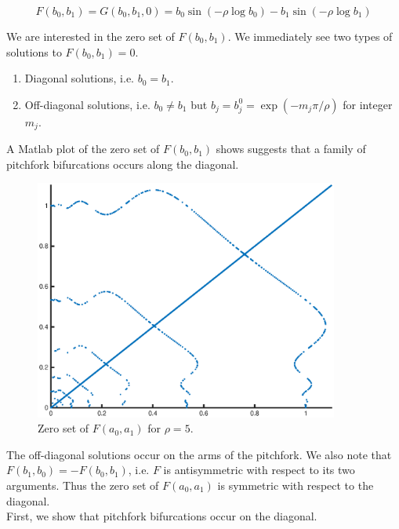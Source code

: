 \documentclass[thesis.tex]{subfiles}
\begin{document}
\begin{equation}\label{defF}
F(b_0, b_1) = G(b_0, b_1, 0) = 
b_0 \sin \left( -\rho \log b_0 \right) - b_1 \sin \left( -\rho \log b_1 \right)
\end{equation}

We are interested in the zero set of $F(b_0, b_1)$. We immediately see two types of solutions to $F(b_0,b_1) = 0$. 

\begin{enumerate}
	\item Diagonal solutions, i.e. $b_0 = b_1$.
	\item Off-diagonal solutions, i.e. $b_0 \neq b_1$ but $b_j = b_j^0 = \exp(-m_j \pi / \rho )$ for integer $m_j$.
\end{enumerate}

A Matlab plot of the zero set of $F(b_0, b_1)$ shows suggests that a family of pitchfork bifurcations occurs along the diagonal. 

\begin{figure}[H]
\label{fig:Fzeronumeric}
\includegraphics[width=10cm]{periodic/zeroset5}
\caption{Zero set of $F(a_0, a_1)$ for $\rho = 5$.}
\end{figure} 

The off-diagonal solutions occur on the arms of the pitchfork. We also note that 
$F(b_1, b_0) = -F(b_0, b_1)$, i.e. $F$ is antisymmetric with respect to its two arguments. Thus the zero set of $F(a_0, a_1)$ is symmetric with respect to the diagonal.\\

First, we show that pitchfork bifurcations occur on the diagonal.

\end{document}
